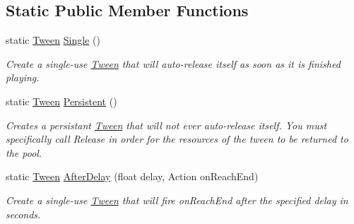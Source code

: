 \subsection*{Static Public Member Functions}
\begin{DoxyCompactItemize}
\item 
static \mbox{\hyperlink{struct_leap_1_1_unity_1_1_animation_1_1_tween}{Tween}} \mbox{\hyperlink{struct_leap_1_1_unity_1_1_animation_1_1_tween_a7238365f2fb16c95082dc5d71b8f5139}{Single}} ()
\begin{DoxyCompactList}\small\item\em Create a single-\/use \mbox{\hyperlink{struct_leap_1_1_unity_1_1_animation_1_1_tween}{Tween}} that will auto-\/release itself as soon as it is finished playing. \end{DoxyCompactList}\item 
static \mbox{\hyperlink{struct_leap_1_1_unity_1_1_animation_1_1_tween}{Tween}} \mbox{\hyperlink{struct_leap_1_1_unity_1_1_animation_1_1_tween_a4e3149fd5f794b71c50a8bb18b6d338e}{Persistent}} ()
\begin{DoxyCompactList}\small\item\em Creates a persistant \mbox{\hyperlink{struct_leap_1_1_unity_1_1_animation_1_1_tween}{Tween}} that will not ever auto-\/release itself. You must specifically call Release in order for the resources of the tween to be returned to the pool. \end{DoxyCompactList}\item 
static \mbox{\hyperlink{struct_leap_1_1_unity_1_1_animation_1_1_tween}{Tween}} \mbox{\hyperlink{struct_leap_1_1_unity_1_1_animation_1_1_tween_a77dd8bb5e57e2fffe9351ad806eaf53f}{After\+Delay}} (float delay, Action on\+Reach\+End)
\begin{DoxyCompactList}\small\item\em Create a single-\/use \mbox{\hyperlink{struct_leap_1_1_unity_1_1_animation_1_1_tween}{Tween}} that will fire on\+Reach\+End after the specified delay in seconds. \end{DoxyCompactList}\end{DoxyCompactItemize}

